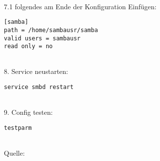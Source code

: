 ~\\
7.1 folgendes am Ende der Konfiguration Einfügen:
\begin{lstlisting}
[samba]
path = /home/sambausr/samba
valid users = sambausr
read only = no
\end{lstlisting}
~\\
8. Service neustarten:
\begin{lstlisting}
service smbd restart
\end{lstlisting}
~\\
9. Config testen:
\begin{lstlisting}
testparm
\end{lstlisting}
~\\Quelle: \cite{samba}
